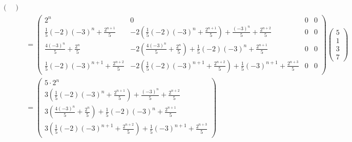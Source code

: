\documentclass{article}
\begin{document}
\begin{align*}
\begin{pmatrix}
        \end{pmatrix}
            \\ &= \begin{pmatrix}
2^n & 0 & 0 & 0 \\
\frac{1}{5} (-2) (-3)^n+\frac{2^{n+1}}{5} & -2 \left(\frac{1}{5} (-2) (-3)^n+\frac{2^{n+1}}{5}\right)+\frac{(-3)^n}{5}+\frac{2^{n+2}}{5} & 0 & 0 \\
\frac{4 (-3)^n}{5}+\frac{2^n}{5} & -2 \left(\frac{4 (-3)^n}{5}+\frac{2^n}{5}\right)+\frac{1}{5} (-2) (-3)^n+\frac{2^{n+1}}{5} & 0 & 0 \\
\frac{1}{5} (-2) (-3)^{n+1}+\frac{2^{n+2}}{5} & -2 \left(\frac{1}{5} (-2) (-3)^{n+1}+\frac{2^{n+2}}{5}\right)+\frac{1}{5} (-3)^{n+1}+\frac{2^{n+3}}{5} & 0 & 0
          \end{pmatrix}\begin{pmatrix}
            5 \\ 1 \\ 3 \\ 7
        \end{pmatrix}
            \\ &= \begin{pmatrix}
 5\cdot 2^n \\
 3 \left(\frac{1}{5} (-2) (-3)^n+\frac{2^{n+1}}{5}\right)+\frac{(-3)^n}{5}+\frac{2^{n+2}}{5} \\
 3 \left(\frac{4 (-3)^n}{5}+\frac{2^n}{5}\right)+\frac{1}{5} (-2) (-3)^n+\frac{2^{n+1}}{5} \\
 3 \left(\frac{1}{5} (-2) (-3)^{n+1}+\frac{2^{n+2}}{5}\right)+\frac{1}{5} (-3)^{n+1}+\frac{2^{n+3}}{5}
        \end{pmatrix}
        \end{align*}
\end{document}
